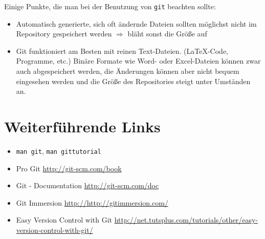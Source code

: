 Einige Punkte, die man bei der Benutzung von \texttt{git} beachten sollte:
\begin{itemize}
  \item Automatisch generierte, sich oft ändernde Dateien sollten
    möglichst nicht im Repository gespeichert werden
    $\Rightarrow$ bläht sonst die Größe auf
  \item Git funktioniert am Besten mit reinen Text-Dateien. (\LaTeX-Code, Programme, etc.)
    Binäre Formate wie Word- oder Excel-Dateien können zwar auch abgespeichert werden,
    die Änderungen können aber nicht bequem eingesehen werden und die Größe des
    Repositories steigt unter Umständen an.
\end{itemize}

\section{Weiterführende Links}
\begin{itemize}
  \item \texttt{man git}, \texttt{man gittutorial}
  \item Pro Git \url{http://git-scm.com/book}
  \item Git - Documentation \url{http://git-scm.com/doc}
  \item Git Immersion \url{http://http://gitimmersion.com/}
  \item Easy Version Control with Git
    \url{http://net.tutsplus.com/tutorials/other/easy-version-control-with-git/}
\end{itemize}
